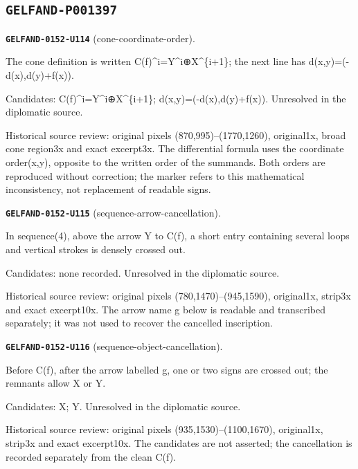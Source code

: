 \subsection*{\texttt{GELFAND-P001397}}
\par\noindent\leavevmode{}\label{GELFAND-0152-U114}\textbf{\texttt{GELFAND-0152-U114}} (cone-coordinate-order).\nopagebreak[4]\par
The cone definition is written C(f)\textasciicircum{}i=Y\textasciicircum{}i⊕X\textasciicircum{}\{i+1\}; the next line has d(x,y)=(-d(x),d(y)+f(x)).\par
Candidates: C(f)\textasciicircum{}i=Y\textasciicircum{}i⊕X\textasciicircum{}\{i+1\}; d(x,y)=(-d(x),d(y)+f(x)). Unresolved in the diplomatic source.\par
Historical source review: original pixels (870,995)–(1770,1260), original1x, broad cone region3x and exact excerpt3x. The differential formula uses the coordinate order(x,y), opposite to the written order of the summands. Both orders are reproduced without correction; the marker refers to this mathematical inconsistency, not replacement of readable signs.\par\medskip
\par\noindent\leavevmode{}\label{GELFAND-0152-U115}\textbf{\texttt{GELFAND-0152-U115}} (sequence-arrow-cancellation).\nopagebreak[4]\par
In sequence(4), above the arrow Y to C(f), a short entry containing several loops and vertical strokes is densely crossed out.\par
Candidates: none recorded. Unresolved in the diplomatic source.\par
Historical source review: original pixels (780,1470)–(945,1590), original1x, strip3x and exact excerpt10x. The arrow name g below is readable and transcribed separately; it was not used to recover the cancelled inscription.\par\medskip
\par\noindent\leavevmode{}\label{GELFAND-0152-U116}\textbf{\texttt{GELFAND-0152-U116}} (sequence-object-cancellation).\nopagebreak[4]\par
Before C(f), after the arrow labelled g, one or two signs are crossed out; the remnants allow X or Y.\par
Candidates: X; Y. Unresolved in the diplomatic source.\par
Historical source review: original pixels (935,1530)–(1100,1670), original1x, strip3x and exact excerpt10x. The candidates are not asserted; the cancellation is recorded separately from the clean C(f).\par\medskip
